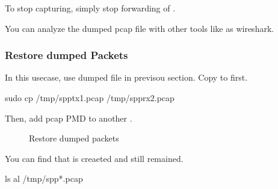 \documentclass[a4paper,11pt,openany,oneside,english]{sphinxmanual}
\begin{document}
To stop capturing, simply stop forwarding of .

\begin{sphinxVerbatim}[commandchars=\\\{\},formatcom=\footnotesize]
\end{sphinxVerbatim}

You can analyze the dumped pcap file with other tools like as wireshark.


\subsubsection{Restore dumped Packets}
\label{\detokenize{usecases/spp_nfv:restore-dumped-packets}}
In this usecase, use dumped file in previsou section.
Copy  to  first.

\begin{sphinxVerbatim}[commandchars=\\\{\},formatcom=\footnotesize]
 sudo cp /tmp/spp\PYGZhy{}tx1.pcap /tmp/spp\PYGZhy{}rx2.pcap
\end{sphinxVerbatim}

Then, add pcap PMD  to another .

\begin{sphinxVerbatim}[commandchars=\\\{\},formatcom=\footnotesize]
\end{sphinxVerbatim}

\begin{figure}[htbp]
\centering
\capstart

\noindent{}
\caption{Restore dumped packets}\label{\detokenize{usecases/spp_nfv:id8}}\label{\detokenize{usecases/spp_nfv:figure-spp-pcap-restoring}}\end{figure}

You can find that  is creaeted and 
still remained.

\begin{sphinxVerbatim}[commandchars=\\\{\},formatcom=\footnotesize]
 ls \PYGZhy{}al /tmp/spp*.pcap
\end{sphinxVerbatim}
\end{document}
